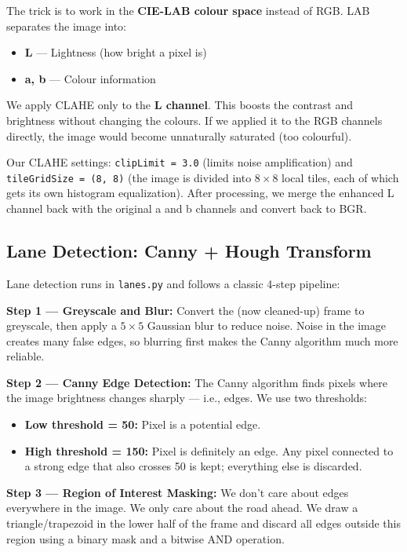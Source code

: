 \documentclass[12pt, a4paper]{article}
\begin{document}
The trick is to work in the \textbf{CIE-LAB colour space} instead of RGB.
LAB separates the image into:
\begin{itemize}
  \item \textbf{L} — Lightness (how bright a pixel is)
  \item \textbf{a, b} — Colour information
\end{itemize}

We apply CLAHE only to the \textbf{L channel}. This boosts the contrast and
brightness without changing the colours. If we applied it to the RGB channels
directly, the image would become unnaturally saturated (too colourful).

Our CLAHE settings: \texttt{clipLimit = 3.0} (limits noise amplification) and
\texttt{tileGridSize = (8, 8)} (the image is divided into $8 \times 8$ local
tiles, each of which gets its own histogram equalization). After processing, we
merge the enhanced L channel back with the original a and b channels and convert
back to BGR.

\subsection{Lane Detection: Canny + Hough Transform}

Lane detection runs in \texttt{lanes.py} and follows a classic 4-step pipeline:

\textbf{Step 1 — Greyscale and Blur:} Convert the (now cleaned-up) frame to greyscale,
then apply a $5 \times 5$ Gaussian blur to reduce noise. Noise in the image creates
many false edges, so blurring first makes the Canny algorithm much more reliable.

\textbf{Step 2 — Canny Edge Detection:} The Canny algorithm finds pixels where
the image brightness changes sharply — i.e., edges. We use two thresholds:
\begin{itemize}
  \item \textbf{Low threshold = 50:} Pixel is a potential edge.
  \item \textbf{High threshold = 150:} Pixel is definitely an edge. Any pixel
  connected to a strong edge that also crosses 50 is kept; everything else
  is discarded.
\end{itemize}

\textbf{Step 3 — Region of Interest Masking:} We don't care about edges everywhere
in the image. We only care about the road ahead. We draw a triangle/trapezoid in
the lower half of the frame and discard all edges outside this region using a
binary mask and a bitwise AND operation.
\end{document}
